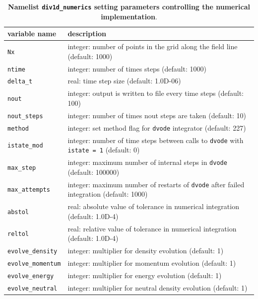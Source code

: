 \documentclass[amsmath,amssymb,a4]{revtex4-2}
\begin{document}
\begin{longtable}{| p{} | p{} |} 
  \caption{{\bf Namelist {\tt div1d\_numerics} setting parameters controlling the numerical implementation}.}  
  \label{tab:input_numerics} 
  \hline 
        variable name                & description \\ \hline \hline
    {\tt Nx}                     & integer: number of points in the grid along the field line (default: 1000) \\ \hline
    {\tt ntime}                  & integer: number of times steps (default: 1000)  \\ \hline
    {\tt delta\_t}               & real: time step size (default: 1.0D-06)  \\ \hline
    {\tt nout}                   & integer: output is written to file every time steps (default: 100) \\ \hline
    {\tt nout\_steps}                   & integer: number of times nout steps are taken (default: 10) \\ \hline
    {\tt method}                 & integer: set method flag for {\tt dvode} integrator (default: 227)   \\ \hline
	{\tt istate\_mod}            & integer: number of time steps between calls to {\tt dvode} with {\tt istate = 1} (default: 0) \\ \hline
	{\tt max\_step}              & integer: maximum number of internal steps in {\tt dvode} (default: 100000) \\ \hline
	{\tt max\_attempts}          & integer: maximum number of restarts of {\tt dvode} after failed integration (default: 1000) \\ \hline
    {\tt abstol}                 & real: absolute value of tolerance in numerical integration (default: 1.0D-4)  \\ \hline
    {\tt reltol}                 & real: relative value of tolerance in numerical integration (default: 1.0D-4)  \\ \hline
	{\tt evolve\_density}        & integer: multiplier for density evolution (default: 1) \\ \hline
	{\tt evolve\_momentum}       & integer: multiplier for momentum evolution (default: 1) \\ \hline
	{\tt evolve\_energy}         & integer: multiplier for energy evolution (default: 1) \\ \hline
	{\tt evolve\_neutral}        & integer: multiplier for neutral density evolution (default: 1) \\ \hline

\end{longtable}
\end{document}
